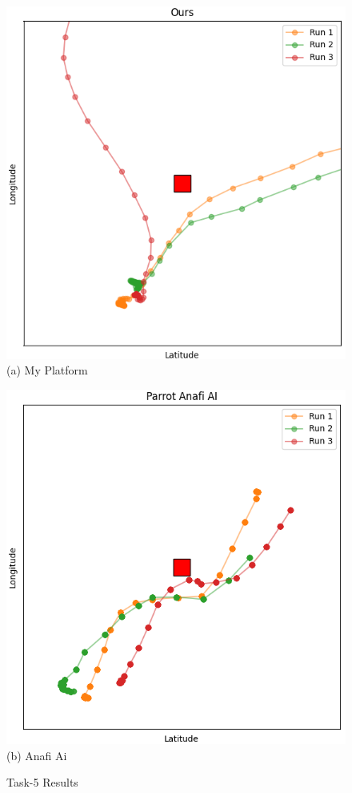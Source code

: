 \begin{figure}
\begin{minipage}[b]{0.495\linewidth}
\centering
\includegraphics[width=0.95\linewidth]{chapter4/FIGS/fig-obstacle-path-ours.png}
{(a) My Platform}
\end{minipage}
\begin{minipage}[b]{0.495\linewidth}
\centering
\includegraphics[width=0.95\linewidth]{chapter4/FIGS/fig-obstacle-path-anafiai.png}
{(b) Anafi Ai}
\end{minipage}
\caption{Task-5 Results}
\label{fig:obstacle-path}
\end{figure}


